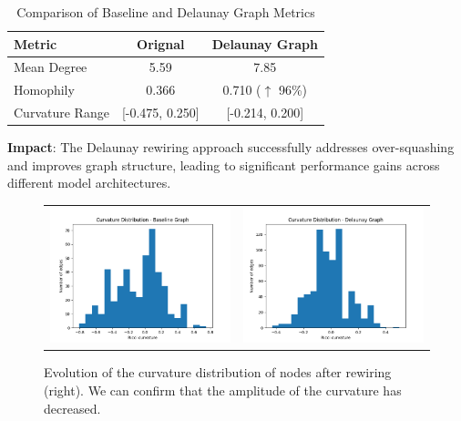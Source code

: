 \documentclass{article}
\theoremstyle{plain}
\theoremstyle{definition}
\theoremstyle{remark}
\begin{document}
\begin{table}[b]
    \caption{Comparison of Baseline and Delaunay Graph Metrics}
    \centering
    \begin{tabular}{|l|c|c|}
        \hline
        \textbf{Metric}          & \textbf{Orignal} & \textbf{Delaunay Graph} \\ \hline
        Mean Degree              & 5.59                   & 7.85               \\ \hline
        Homophily                & 0.366                  & 0.710 ($\uparrow$ 96\%) \\ \hline
        Curvature Range          & [-0.475, 0.250]        & [-0.214, 0.200]         \\ \hline
    \end{tabular}
    \label{tab:metric_comparison}
\end{table}
    
\textbf{Impact}: The Delaunay rewiring approach successfully addresses 
over-squashing and improves graph structure, leading to significant performance 
gains across different model architectures.

\begin{figure}[htb]
    \begin{center}
        \begin{tabular}{cc}
            \includegraphics[width=0.4\columnwidth]{figures/baseline_curvature_dist_baseline_graph_20250321_203836.png}&
            \includegraphics[width=0.4\columnwidth]{figures/delaunay_curvature_dist_delaunay_graph_20250321_204407.png}
        \end{tabular}
    \vskip -0.2in
    \caption{Evolution of the curvature distribution of nodes after rewiring (right).
    We can confirm that the amplitude of the curvature has decreased.}
    \label{fig:delaunay_curvature}
    \end{center}
\end{figure}
\end{document}
